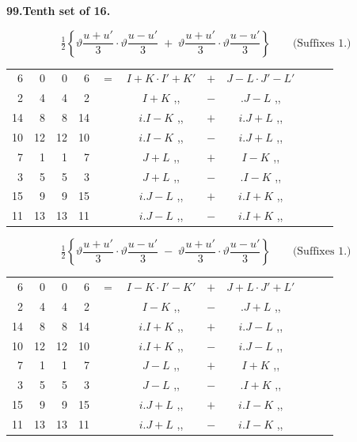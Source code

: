 \documentclass[11pt]{article}
\newcommand{\half}{\tfrac{1}{2}}
\begin{document}
\medskip
\begin{center}\textbf{99.\quad Tenth set of 16.}\end{center}

\[
\half\!\left\{\vartheta\frac{u+u'}{3}\cdot\vartheta\frac{u-u'}{3}\;+\;\vartheta\frac{u+u'}{3}\cdot\vartheta\frac{u-u'}{3}\right\}\qquad\text{(Suffixes 1.)}
\]
{\small
\begin{center}
\begin{tabular}{rrrrr@{\ }c@{\ }lcr@{\ }c@{\ }l}
6  & 0  & 0  & 6  & $=$ & $I+K\cdot I'+K'$ & $+$ & $J-L\cdot J'-L'$ \\
2  & 4  & 4  & 2  & & $I+K$ \quad ,, & $-$ & $.J-L$ \quad ,, \\
14 & 8  & 8  & 14 & & $i.I-K$ \quad ,, & $+$ & $i.J+L$ \quad ,, \\
10 & 12 & 12 & 10 & & $i.I-K$ \quad ,, & $-$ & $i.J+L$ \quad ,, \\
7  & 1  & 1  & 7  & & $J+L$ \quad ,, & $+$ & $I-K$ \quad ,, \\
3  & 5  & 5  & 3  & & $J+L$ \quad ,, & $-$ & $.I-K$ \quad ,, \\
15 & 9  & 9  & 15 & & $i.J-L$ \quad ,, & $+$ & $i.I+K$ \quad ,, \\
11 & 13 & 13 & 11 & & $i.J-L$ \quad ,, & $-$ & $i.I+K$ \quad ,, \\
\end{tabular}
\end{center}
}

\[
\half\!\left\{\vartheta\frac{u+u'}{3}\cdot\vartheta\frac{u-u'}{3}\;-\;\vartheta\frac{u+u'}{3}\cdot\vartheta\frac{u-u'}{3}\right\}\qquad\text{(Suffixes 1.)}
\]
{\small
\begin{center}
\begin{tabular}{rrrrr@{\ }c@{\ }lcr@{\ }c@{\ }l}
6  & 0  & 0  & 6  & $=$ & $I-K\cdot I'-K'$ & $+$ & $J+L\cdot J'+L'$ \\
2  & 4  & 4  & 2  & & $I-K$ \quad ,, & $-$ & $.J+L$ \quad ,, \\
14 & 8  & 8  & 14 & & $i.I+K$ \quad ,, & $+$ & $i.J-L$ \quad ,, \\
10 & 12 & 12 & 10 & & $i.I+K$ \quad ,, & $-$ & $i.J-L$ \quad ,, \\
7  & 1  & 1  & 7  & & $J-L$ \quad ,, & $+$ & $I+K$ \quad ,, \\
3  & 5  & 5  & 3  & & $J-L$ \quad ,, & $-$ & $.I+K$ \quad ,, \\
15 & 9  & 9  & 15 & & $i.J+L$ \quad ,, & $+$ & $i.I-K$ \quad ,, \\
11 & 13 & 13 & 11 & & $i.J+L$ \quad ,, & $-$ & $i.I-K$ \quad ,, \\
\end{tabular}
\end{center}
}
\end{document}
